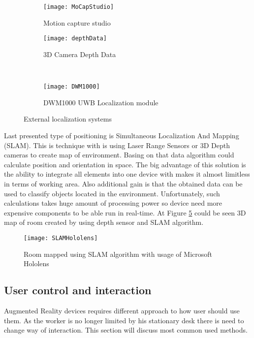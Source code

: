 \documentclass[printmode,en]{mgr}
\begin{document}
\begin{figure}[!ht]
\centering
\begin{subfigure}{.45\textwidth}
  \centering
  \texttt{[image: MoCapStudio]}
  \caption{Motion capture studio \cite{MoCapStudio}}
  \label{fig:MoCapStudio}
\end{subfigure}
\begin{subfigure}{.45\textwidth}
  \centering
  \texttt{[image: depthData]}
  \caption{3D Camera Depth Data \cite{depthData}}
  \label{fig:depthData}
\end{subfigure}\\
\begin{subfigure}{.5\textwidth}
  \centering
  \texttt{[image: DWM1000]}
  \caption{DWM1000 UWB Localization module \cite{DWM1000}}
  \label{fig:DWM1000}
\end{subfigure}
\caption{External localization systems}
\label{fig:externalDevicesLocalization}
\end{figure}

Last presented type of positioning is Simultaneous Localization And Mapping (SLAM). This is technique with is using Laser Range Sensors or 3D Depth cameras to create map of environment. Basing on that data algorithm could calculate position and orientation in space. The big advantage of this solution is the ability to integrate all elements into one device with makes it almost limitless in terms of working area. Also additional gain is that the obtained data can be used to classify objects located in the environment. Unfortunately, such calculations takes huge amount of processing power so device need more expensive components to be able run in real-time. At Figure \ref{fig:SLAMHololens} could be seen 3D map of room created by using depth sensor and SLAM algorithm.

\begin{figure}[!ht]
  \centering
    \texttt{[image: SLAMHololens]}
  \caption{Room mapped using SLAM algorithm with usage of Microsoft Hololens}
  \label{fig:SLAMHololens}
\end{figure}

\subsection{User control and interaction}
Augmented Reality devices requires different approach to how user should use them. As the worker is no longer limited by his stationary desk there is need to change way of interaction. This section will discuss most common used methods.\\
\end{document}
